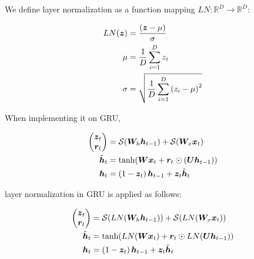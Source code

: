 

We define layer normalization as a function mapping $LN: \mathbb{R}^D \rightarrow \mathbb{R}^D$:

\begin{align}
    \begin{split}
        LN({\boldsymbol{z}}) &= \frac{( {\boldsymbol{z}}-\mu )}{\sigma} \\
        \mu &= \frac{1}{D} \sum^{D}_{i=1} z_i \\
        \sigma &= \sqrt{ \frac{1}{D} \sum^{D}_{i=1} \left( z_i- \mu \right)^{2} }
    \end{split}
\end{align}

\noindent When implementing it on GRU,

\begin{align}
    \begin{split}
        \begin{pmatrix}
            {\boldsymbol{z}}_t \\
            {\boldsymbol{r}}_t
        \end{pmatrix} &=  \mathcal{S}( {\boldsymbol{W}}_h {\boldsymbol{h}}_{t-1} ) + \mathcal{S}( {\boldsymbol{W}}_x {\boldsymbol{x}}_t ) \\
        \tilde{{\boldsymbol{h}}}_t &= \text{tanh}( {\boldsymbol{W}} {\boldsymbol{x}}_t +  {\boldsymbol{r}}_t \odot \left( {\boldsymbol{U}} {\boldsymbol{h}}_{t-1} \right) ) \\
        {\boldsymbol{h}}_t &= \left( 1- {\boldsymbol{z}}_t \right) {\boldsymbol{h}}_{t-1} + {\boldsymbol{z}}_t \tilde{{\boldsymbol{h}}}_t
    \end{split}
\end{align}

\noindent layer normalization in GRU is applied as follows:

\begin{align}
    \begin{split}
        \begin{pmatrix}
            {\boldsymbol{z}}_t \\
            {\boldsymbol{r}}_t
        \end{pmatrix} &=   \mathcal{S}( LN( {\boldsymbol{W}}_h  {\boldsymbol{h}}_{t-1} ) ) + \mathcal{S}( LN(  {\boldsymbol{W}}_x {\boldsymbol{x}}_t  ) ) \\
        \tilde{{\boldsymbol{h}}}_t &= \text{tanh} (  LN( {\boldsymbol{W}} {\boldsymbol{x}}_t  ) +  {\boldsymbol{r}}_t \odot LN( {\boldsymbol{U}} {\boldsymbol{h}}_{t-1} ) ) \\
        {\boldsymbol{h}}_t &= \left( 1- {\boldsymbol{z}}_t \right) {\boldsymbol{h}}_{t-1} + {\boldsymbol{z}}_t \tilde{{\boldsymbol{h}}}_t
    \end{split}
\end{align}

